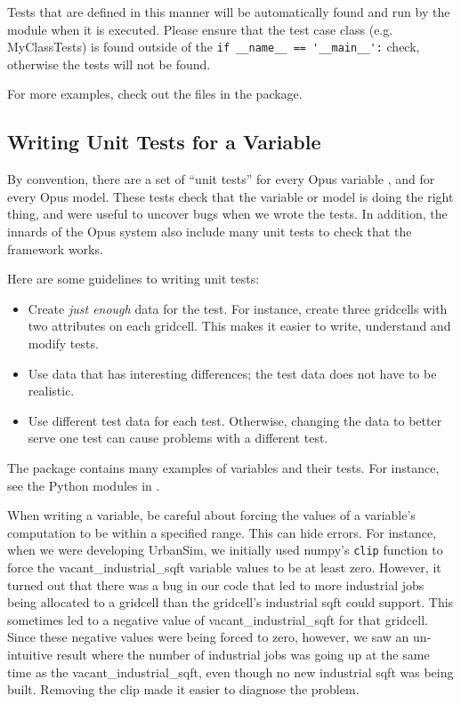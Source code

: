Tests that are defined in this manner will be automatically found and run by the
 module when it is executed. Please ensure that the test case
class (e.g. MyClassTests) is found outside of the
\verb|if __name__ == '__main__':| check, otherwise the tests will not be found.

For more examples, check out the files in the  package.

\subsection{Writing Unit Tests for a Variable}
%
By convention, there are a set of ``unit tests'' for every Opus variable
, and for every Opus model.  These tests check that the variable
or model is doing the right thing, and were useful to uncover bugs when we wrote
the tests.  In addition, the innards of the Opus system also include
many unit tests to check that the framework works.

Here are some guidelines to writing unit tests:
\begin{itemize}
  \item Create \emph{just enough} data for the test.  For instance, create
  three gridcells with two attributes on each gridcell.  This
  makes it easier to write, understand and modify tests.
  \item Use data that has interesting differences; the test data does not have
  to be realistic.
  \item Use different test data for each test.  Otherwise, changing the data to
  better serve one test can cause problems with a different test.
\end{itemize}

The  package contains many examples of variables and their
tests.  For instance, see the Python modules in .

When writing a variable, be careful about forcing the values of a variable's
computation to be within a specified range.  This can hide
errors.  For instance, when we were developing UrbanSim, we initially used
numpy's \verb|clip| function to force the
vacant_industrial_sqft variable values to be at least zero.
However, it turned out that there was a bug in our code that led to more
industrial jobs being allocated to a gridcell than the gridcell's industrial
sqft could support.  This sometimes led to a negative value of
vacant_industrial_sqft for that gridcell.  Since these negative values were
being forced to zero, however, we saw an un-intuitive result where the number
of industrial jobs was going up at the same time as the vacant_industrial_sqft,
even though no new industrial sqft was being built. Removing the clip made it
easier to diagnose the problem.

